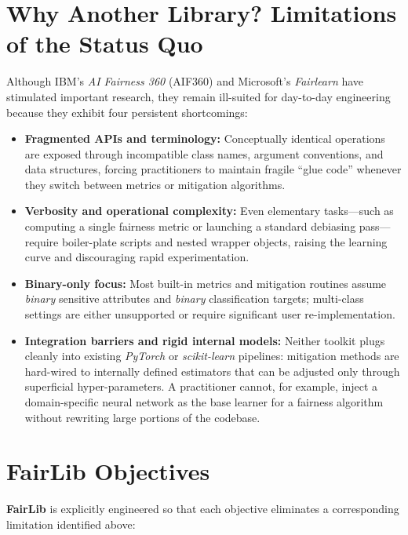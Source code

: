 \documentclass[12pt,a4paper,openright,twoside]{book}
\begin{document}
\section{Why Another Library?  Limitations of the Status Quo}
Although IBM’s \textit{AI Fairness 360} (AIF360) \cite{bellamy2019aif360} and Microsoft’s
\textit{Fairlearn} \cite{bird2020fairlearn} have stimulated important research,
they remain ill-suited for day-to-day engineering because they exhibit four
persistent shortcomings:

\begin{itemize}
  \item \textbf{Fragmented APIs and terminology:}  
  Conceptually identical operations are exposed through incompatible
  class names, argument conventions, and data structures, forcing practitioners
  to maintain fragile “glue code” whenever they switch between metrics or
  mitigation algorithms.

  \item \textbf{Verbosity and operational complexity:}  
  Even elementary tasks—such as computing a single fairness metric or launching
  a standard debiasing pass—require boiler-plate scripts and nested wrapper
  objects, raising the learning curve and discouraging rapid experimentation.

  \item \textbf{Binary-only focus:}
  Most built-in metrics and mitigation routines assume \emph{binary} sensitive
  attributes and \emph{binary} classification targets; multi-class settings are
  either unsupported or require significant user re-implementation.

  \item \textbf{Integration barriers and rigid internal models:}  
  Neither toolkit plugs cleanly into existing \textit{PyTorch} or
  \textit{scikit-learn} pipelines: mitigation methods are hard-wired to
  internally defined estimators that can be adjusted only through superficial
  hyper-parameters.  A practitioner cannot, for example, inject a
  domain-specific neural network as the base learner for a fairness algorithm
  without rewriting large portions of the codebase.
\end{itemize}
\section{FairLib Objectives}
\textbf{FairLib} is explicitly engineered so that each objective eliminates a
corresponding limitation identified above:
\end{document}
